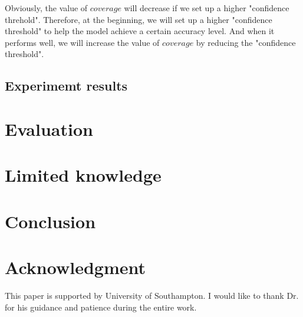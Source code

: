 \documentclass[conference]{IEEEtran}
\begin{document}
Obviously, the value of $coverage$ will decrease if we set up a higher "confidence threhold". Therefore, at the beginning, we will set up a higher "confidence threshold" to help the model achieve a certain accuracy level. And when it performs well, we will increase the value of $coverage$ by reducing the "confidence threshold". \subsection{Experimemt results}






\section{Evaluation}



\section{Limited knowledge}



\section{Conclusion}




\section*{Acknowledgment}


This paper is supported by University of Southampton. I would like to thank Dr. for his guidance and patience during the entire work.






\end{document}
